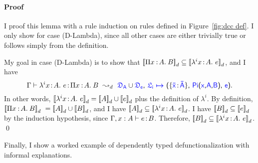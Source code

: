 \paragraph{Proof} I proof this lemma with a rule induction on rules defined in Figure~\ref{fig:dcc def}. 
I only show for case (D-Lambda), since all other cases are either trivially true or follows simply from the definition.

My goal in case (D-Lambda) is to show that ${[\![ \Pi x\mkern1.5mu{\hspace{0.5mm}{:}\hspace{0.5mm}} A.\hspace{0.8mm}B ]\!]}_d \subseteq {[\![ \lambda^{i}x\hspace{0.5mm}{:}\hspace{0.5mm}A.\ e ]\!]}_d$, and I have
\begin{equation*}
\Gamma \vdash \lami{i}{x}{A}{e} \goodcolon \pitype{x}{A}{B}\ \leadsto_d\ \target{\fdef_A} \cup \target{\fdef_e} \sfcomma \itemdef{\target{\flabel_i}}{\itemtype{\bar{x}}{\bar{A}}}{\targetpi{x}{A}{B}}{\target{e}}.
\end{equation*}
In other words, ${[\![ \lambda^{i}x\hspace{0.5mm}{:}\hspace{0.5mm} A.\ e ]\!]}_d = {[\![ A ]\!]}_d \cup {[\![ e ]\!]}_d$ plus the definition of $\lambda^i$. By definition, $\bbracket{\pitype{x}{A}{B}}_d\ = \bbracket{A}_d \cup \bbracket{B}_d$, and I have ${[\![ A ]\!]}_d \subseteq {[\![ \lambda^{i}x\hspace{0.5mm}{:}\hspace{0.5mm}A.\ e ]\!]}_d$. 
I have ${[\![ B ]\!]}_d \subseteq {[\![ e ]\!]}_d$ by the induction hypothesis, since $\Gamma, x:A \vdash e \hspace{0.5mm}{:}\hspace{0.5mm} B$. Therefore, ${[\![ B ]\!]}_d \subseteq {[\![ \lambda^{i}x\hspace{0.5mm}{:}\hspace{0.5mm}A.\ e ]\!]}_d$. \qed

Finally, I show a worked example of dependently typed defunctionalization with informal explanations.

